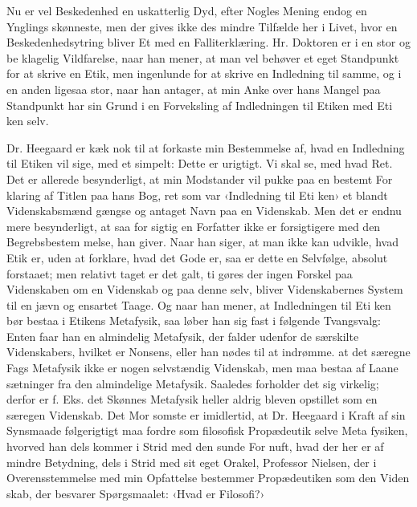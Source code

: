 \documentclass[12pt,a4paper,openany]{book}
\newcommand{\opage}[1]{\marginnote{\footnotesize\textit{[#1]}}}
\begin{document}
Nu er vel Beskedenhed en uskatterlig Dyd, efter Nogles
Mening endog en Ynglings skønneste, men der gives ikke des\-%
mindre Tilfælde her i Livet, hvor en Beskedenhedsytring bliver
Et med en Falliterklæring. Hr. Doktoren er i en stor og be\-%
klagelig Vildfarelse, naar han mener, at man vel behøver et
eget Standpunkt for at skrive en Etik, men ingenlunde for at
skrive en Indledning til samme, og i en anden ligesaa stor, naar
han antager, at min Anke over hans Mangel paa Standpunkt har
sin Grund i en Forveksling af Indledningen til Etiken med Eti\-%
ken selv.

Dr. Heegaard er kæk nok til at forkaste min Bestemmelse
\opage{37}af, hvad en Indledning til Etiken vil sige, med et simpelt:
Dette er urigtigt. Vi skal se, med hvad Ret. Det er allerede
besynderligt, at min Modstander vil pukke paa en bestemt For\-%
klaring af Titlen paa hans Bog, ret som var ‹Indledning til Eti\-%
ken› et blandt Videnskabsmænd gængse og antaget Navn paa
en Videnskab. Men det er endnu mere besynderligt, at saa for\-%
sigtig en Forfatter ikke er forsigtigere med den Begrebsbestem\-%
melse, han giver. Naar han siger, at man ikke kan udvikle,
hvad Etik er, uden at forklare, hvad det Gode er, saa er dette
en Selvfølge, absolut forstaaet; men relativt taget er det galt, ti
gøres der ingen Forskel paa Videnskaben om en Videnskab og
paa denne selv, bliver Videnskabernes System til en jævn og
ensartet Taage. Og naar han mener, at Indledningen til Eti\-%
ken bør bestaa i Etikens Metafysik, saa løber han sig fast i
følgende Tvangsvalg: Enten faar han en almindelig Metafysik, der
falder udenfor de særskilte Videnskabers, hvilket er Nonsens,
eller han nødes til at indrømme. at det særegne Fags Metafysik
ikke er nogen selvstændig Videnskab, men maa bestaa af Laane\-%
sætninger fra den almindelige Metafysik. Saaledes forholder
det sig virkelig; derfor er f. Eks. det Skønnes Metafysik heller
aldrig bleven opstillet som en særegen Videnskab. Det Mor\-%
somste er imidlertid, at Dr. Heegaard i Kraft af sin Synsmaade
følgerigtigt maa fordre som filosofisk Propædeutik selve Meta\-%
fysiken, hvorved han dels kommer i Strid med den sunde For\-%
nuft, hvad der her er af mindre Betydning, dels i Strid med
sit eget Orakel, Professor Nielsen, der i Overensstemmelse
med min Opfattelse bestemmer Propædeutiken som den Viden\-%
skab, der besvarer Spørgsmaalet: ‹Hvad er Filosofi?›
\end{document}
